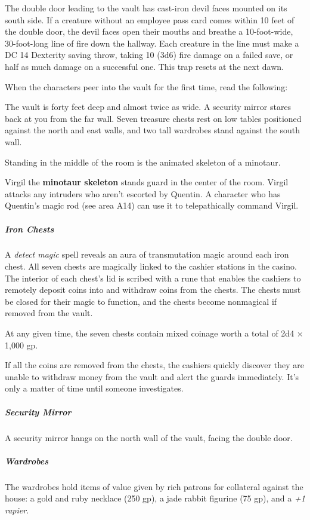 \documentclass[10pt,a4paper,twoside,bg=print,twocolumn,openany,nodeprecatedcode]{dndbook}
\begin{document}
The double door leading to the vault has cast-iron devil faces mounted on its south side. If a creature without an employee pass card comes within 10 feet of the double door, the devil faces open their mouths and breathe a 10-foot-wide, 30-foot-long line of fire down the hallway. Each creature in the line must make a DC 14 Dexterity saving throw, taking 10 (3d6) fire damage on a failed save, or half as much damage on a successful one. This trap resets at the next dawn.

When the characters peer into the vault for the first time, read the following:

\begin{DndReadAloud}{}
The vault is forty feet deep and almost twice as wide. A security mirror stares back at you from the far wall. Seven treasure chests rest on low tables positioned against the north and east walls, and two tall wardrobes stand against the south wall.

Standing in the middle of the room is the animated skeleton of a minotaur.

\end{DndReadAloud}

Virgil the \textbf{minotaur skeleton} stands guard in the center of the room. Virgil attacks any intruders who aren't escorted by Quentin. A character who has Quentin's magic rod (see area A14) can use it to telepathically command Virgil.

\subparagraph{Iron Chests}
A \textit{detect magic} spell reveals an aura of transmutation magic around each iron chest. All seven chests are magically linked to the cashier stations in the casino. The interior of each chest's lid is scribed with a rune that enables the cashiers to remotely deposit coins into and withdraw coins from the chests. The chests must be closed for their magic to function, and the chests become nonmagical if removed from the vault.

At any given time, the seven chests contain mixed coinage worth a total of 2d4 × 1,000 gp.

If all the coins are removed from the chests, the cashiers quickly discover they are unable to withdraw money from the vault and alert the guards immediately. It's only a matter of time until someone investigates.

\subparagraph{Security Mirror}
A security mirror hangs on the north wall of the vault, facing the double door.

\subparagraph{Wardrobes}
The wardrobes hold items of value given by rich patrons for collateral against the house: a gold and ruby necklace (250 gp), a jade rabbit figurine (75 gp), and a \textit{+1 rapier}.
\end{document}
